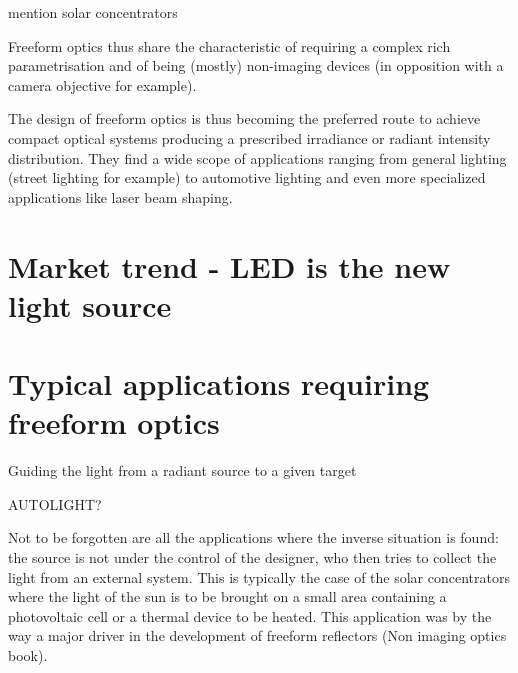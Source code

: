 \TODO mention solar concentrators

Freeform optics thus share the characteristic of requiring a complex rich
parametrisation and of being (mostly) non-imaging devices (in opposition with 
a camera objective for example).  

The design of freeform optics is thus becoming the preferred route to
achieve compact optical systems producing a prescribed irradiance or
radiant intensity distribution.  They find a wide scope of applications ranging
from general lighting (street lighting for example) to automotive
lighting and even more specialized applications like laser beam
shaping.

%

\section{Market trend - LED is the new light source}



\section{Typical applications requiring freeform optics}
Guiding the light from a radiant source to a given target 

\img AUTOLIGHT?

Not to be forgotten are all the applications where the inverse situation is 
found: the source is not under the control of the designer, who then
tries to collect the light from an external system.
This is typically the case of the solar concentrators where the light of the sun
is to be brought on a small area containing a photovoltaic cell or a thermal device
to be heated.
This application was by the way a major driver in the development of
freeform reflectors (\cit Non imaging 
optics book).

